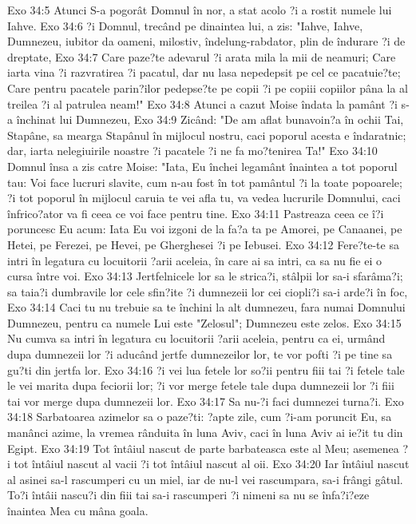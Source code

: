 Exo 34:5  Atunci S-a pogorât Domnul în nor, a stat acolo ?i a rostit numele lui Iahve.
Exo 34:6  ?i Domnul, trecând pe dinaintea lui, a zis: "Iahve, Iahve, Dumnezeu, iubitor da oameni, milostiv, îndelung-rabdator, plin de îndurare ?i de dreptate,
Exo 34:7  Care paze?te adevarul ?i arata mila la mii de neamuri; Care iarta vina ?i razvratirea ?i pacatul, dar nu lasa nepedepsit pe cel ce pacatuie?te; Care pentru pacatele parin?ilor pedepse?te pe copii ?i pe copiii copiilor pâna la al treilea ?i al patrulea neam!"
Exo 34:8  Atunci a cazut Moise îndata la pamânt ?i s-a închinat lui Dumnezeu,
Exo 34:9  Zicând: "De am aflat bunavoin?a în ochii Tai, Stapâne, sa mearga Stapânul în mijlocul nostru, caci poporul acesta e îndaratnic; dar, iarta nelegiuirile noastre ?i pacatele ?i ne fa mo?tenirea Ta!"
Exo 34:10  Domnul însa a zis catre Moise: "Iata, Eu închei legamânt înaintea a tot poporul tau: Voi face lucruri slavite, cum n-au fost în tot pamântul ?i la toate popoarele; ?i tot poporul în mijlocul caruia te vei afla tu, va vedea lucrurile Domnului, caci înfrico?ator va fi ceea ce voi face pentru tine.
Exo 34:11  Pastreaza ceea ce î?i poruncesc Eu acum: Iata Eu voi izgoni de la fa?a ta pe Amorei, pe Canaanei, pe Hetei, pe Ferezei, pe Hevei, pe Gherghesei ?i pe Iebusei.
Exo 34:12  Fere?te-te sa intri în legatura cu locuitorii ?arii aceleia, în care ai sa intri, ca sa nu fie ei o cursa între voi.
Exo 34:13  Jertfelnicele lor sa le strica?i, stâlpii lor sa-i sfarâma?i; sa taia?i dumbravile lor cele sfin?ite ?i dumnezeii lor cei ciopli?i sa-i arde?i în foc,
Exo 34:14  Caci tu nu trebuie sa te închini la alt dumnezeu, fara numai Domnului Dumnezeu, pentru ca numele Lui este "Zelosul"; Dumnezeu este zelos.
Exo 34:15  Nu cumva sa intri în legatura cu locuitorii ?arii aceleia, pentru ca ei, urmând dupa dumnezeii lor ?i aducând jertfe dumnezeilor lor, te vor pofti ?i pe tine sa gu?ti din jertfa lor.
Exo 34:16  ?i vei lua fetele lor so?ii pentru fiii tai ?i fetele tale le vei marita dupa feciorii lor; ?i vor merge fetele tale dupa dumnezeii lor ?i fiii tai vor merge dupa dumnezeii lor.
Exo 34:17  Sa nu-?i faci dumnezei turna?i.
Exo 34:18  Sarbatoarea azimelor sa o paze?ti: ?apte zile, cum ?i-am poruncit Eu, sa manânci azime, la vremea rânduita în luna Aviv, caci în luna Aviv ai ie?it tu din Egipt.
Exo 34:19  Tot întâiul nascut de parte barbateasca este al Meu; asemenea ?i tot întâiul nascut al vacii ?i tot întâiul nascut al oii.
Exo 34:20  Iar întâiul nascut al asinei sa-l rascumperi cu un miel, iar de nu-l vei rascumpara, sa-i frângi gâtul. To?i întâii nascu?i din fiii tai sa-i rascumperi ?i nimeni sa nu se înfa?i?eze înaintea Mea cu mâna goala.

